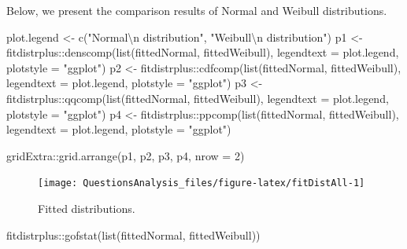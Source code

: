 \documentclass[
]{article}
\newenvironment{Shaded}{\begin{snugshade}}{\end{snugshade}}
\newcommand{\AttributeTok}[1]{\textcolor[rgb]{0.77,0.63,0.00}{#1}}
\newcommand{\DecValTok}[1]{\textcolor[rgb]{0.00,0.00,0.81}{#1}}
\newcommand{\FunctionTok}[1]{\textcolor[rgb]{0.00,0.00,0.00}{#1}}
\newcommand{\NormalTok}[1]{#1}
\newcommand{\OtherTok}[1]{\textcolor[rgb]{0.56,0.35,0.01}{#1}}
\newcommand{\SpecialCharTok}[1]{\textcolor[rgb]{0.00,0.00,0.00}{#1}}
\newcommand{\StringTok}[1]{\textcolor[rgb]{0.31,0.60,0.02}{#1}}
\begin{document}
Below, we present the comparison results of Normal and Weibull distributions.

\begin{Shaded}
\begin{Highlighting}[]
\NormalTok{plot.legend }\OtherTok{\textless{}{-}} \FunctionTok{c}\NormalTok{(}\StringTok{"Normal}\SpecialCharTok{\textbackslash{}n}\StringTok{ distribution"}\NormalTok{, }\StringTok{"Weibull}\SpecialCharTok{\textbackslash{}n}\StringTok{ distribution"}\NormalTok{)}
\NormalTok{p1 }\OtherTok{\textless{}{-}}\NormalTok{ fitdistrplus}\SpecialCharTok{::}\FunctionTok{denscomp}\NormalTok{(}\FunctionTok{list}\NormalTok{(fittedNormal, fittedWeibull), }\AttributeTok{legendtext =}\NormalTok{ plot.legend, }\AttributeTok{plotstyle =} \StringTok{"ggplot"}\NormalTok{)}
\NormalTok{p2 }\OtherTok{\textless{}{-}}\NormalTok{ fitdistrplus}\SpecialCharTok{::}\FunctionTok{cdfcomp}\NormalTok{(}\FunctionTok{list}\NormalTok{(fittedNormal, fittedWeibull), }\AttributeTok{legendtext =}\NormalTok{ plot.legend, }\AttributeTok{plotstyle =} \StringTok{"ggplot"}\NormalTok{)}
\NormalTok{p3 }\OtherTok{\textless{}{-}}\NormalTok{ fitdistrplus}\SpecialCharTok{::}\FunctionTok{qqcomp}\NormalTok{(}\FunctionTok{list}\NormalTok{(fittedNormal, fittedWeibull), }\AttributeTok{legendtext =}\NormalTok{ plot.legend, }\AttributeTok{plotstyle =} \StringTok{"ggplot"}\NormalTok{)}
\NormalTok{p4 }\OtherTok{\textless{}{-}}\NormalTok{ fitdistrplus}\SpecialCharTok{::}\FunctionTok{ppcomp}\NormalTok{(}\FunctionTok{list}\NormalTok{(fittedNormal, fittedWeibull), }\AttributeTok{legendtext =}\NormalTok{ plot.legend, }\AttributeTok{plotstyle =} \StringTok{"ggplot"}\NormalTok{)}

\NormalTok{gridExtra}\SpecialCharTok{::}\FunctionTok{grid.arrange}\NormalTok{(p1, p2, p3, p4, }\AttributeTok{nrow =} \DecValTok{2}\NormalTok{)}
\end{Highlighting}
\end{Shaded}

\begin{figure}

{\centering \texttt{[image: QuestionsAnalysis\_files/figure-latex/fitDistAll-1]} 

}

\caption{Fitted distributions.}\label{fig:fitDistAll}
\end{figure}

\begin{Shaded}
\begin{Highlighting}[]
\NormalTok{fitdistrplus}\SpecialCharTok{::}\FunctionTok{gofstat}\NormalTok{(}\FunctionTok{list}\NormalTok{(fittedNormal, fittedWeibull))}
\end{Highlighting}
\end{Shaded}
\end{document}
